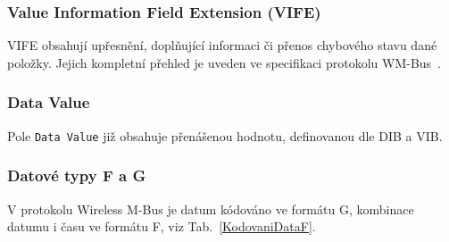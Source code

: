 \newpage

\subsubsection{Value Information Field Extension (VIFE)}
VIFE obsahují upřesnění, doplňující informaci či přenos chybového stavu dané položky. Jejich kompletní přehled je uveden ve specifikaci protokolu WM-Bus~\cite{WmBusSpecka}.


\subsubsection{Data Value}
Pole \texttt{Data Value} již obsahuje přenášenou hodnotu, definovanou dle DIB a VIB.


\subsubsection{Datové typy F a G}
V protokolu Wireless M-Bus je datum kódováno ve formátu G, kombinace datumu i času ve formátu F, viz Tab.~\ref{KodovaniDataF}.  

